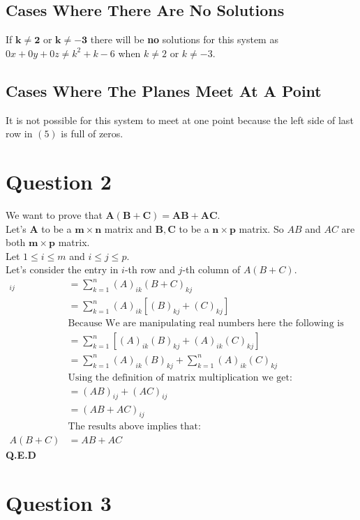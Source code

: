 \documentclass[11pt]{article}
\begin{document}
\subsection{Cases Where There Are No Solutions}
If $\bm{k \neq 2}$ or $\bm{k \neq -3}$ there will be {\bf no} solutions for this system as $0x + 0y + 0z \neq k^2+k-6$ when $k \neq 2$ or $k \neq -3$.

\subsection{Cases Where The Planes Meet At A Point}
It is not possible for this system to meet at one point because the left side of last row in $(5)$ is full of zeros. 

\newpage

\section{Question 2}
We want to prove that $\bm{A(B+C)=AB+AC}$.\\
Let's $\bm{A}$ to be a $\bm{m \times n}$ matrix and $\bm{B,C}$ to be a  $\bm{n \times p}$ matrix.
So $AB$ and $AC$ are both $\bm{m \times p}$ matrix. \\
Let $1 \leq i \leq m$ and $i \leq j \leq p$.\\
Let's consider the entry in $i$-th row and $j$-th column of $A(B+C)$.
\begin{align*}
[A(B+C)]_{ij}&=\sum^n_{k=1}(A)_{ik}(B+C)_{kj}\\
&=\sum^n_{k=1}(A)_{ik}\left[(B)_{kj}+(C)_{kj}\right]\\
&\text{Because We are manipulating real numbers here the following is allowed:}\\
&=\sum^n_{k=1}\left[(A)_{ik}(B)_{kj}+(A)_{ik}(C)_{kj}\right]\\
&=\sum^n_{k=1}(A)_{ik}(B)_{kj}+\sum^n_{k=1}(A)_{ik}(C)_{kj}\\
&\text{Using the definition of matrix multiplication we get:}\\
&=(AB)_{ij}+(AC)_{ij}\\
&=(AB+AC)_{ij}\\
&\text{The results above implies that:}\\
A(B+C)&=AB+AC
\end{align*}
{\bf Q.E.D}
\newpage

\section{Question 3}
\end{document}
